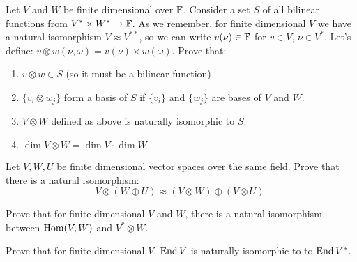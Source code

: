 \begin{prob}
  Let $V$ and $W$ be finite dimensional over $\mathbb F$.
  Consider a set $S$ of all bilinear functions from $V^*\times W^*\to \mathbb F$. As we remember, for finite dimensional $V$ we have a natural isomorphism $V\approx V^{**}$,
  so we can write $v(\nu)\in \mathbb F$ for $v\in V,\,\nu\in V^*$. Let's define: $v\otimes w(\nu, \omega) = v(\nu)\times w(\omega)$. Prove that:
  \begin{enumerate}
    \item $v\otimes w\in S$ (so it must be a bilinear function)
    \item $\{v_i\otimes w_j\}$ form a basis of $S$ if $\{v_i\}$ and $\{w_j\}$ are bases of $V$ and $W$.
    \item $V\otimes W$ defined as above is naturally isomorphic to $S$.
    \item $\dim V\otimes W = \dim V \cdot \dim W$
  \end{enumerate}
\end{prob}

\begin{prob}
  Let $V, W, U$ be finite dimensional vector spaces over the same field. Prove that there is a natural isomorphism:
  $$V\otimes(W\oplus U)\approx (V\otimes W) \oplus (V\otimes U).$$
\end{prob}

\begin{prob}
  Prove that for finite dimensional $V$ and $W$, there is a natural isomorphism between $\text{Hom}(V,W)$ and $V^*\otimes W$.
\end{prob}

\begin{prob}
  Prove that for finite dimensional $V$, $\text{End\,} V$ is naturally isomorphic to to $\text{End\,} V^*$.
\end{prob}

